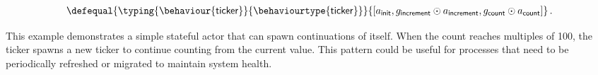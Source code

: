 \begin{example}
    \begin{equation}\label{eq:ticker-behaviour}
    \begin{aligned}
    \defequal{
      \typing{\behaviour{\mathsf{ticker}}}{\behaviourtype{\mathsf{ticker}}}
    }{
      [ a_{\mathsf{init}}
      , g_{\mathsf{increment}} \odot a_{\mathsf{increment}}
      , g_{\mathsf{count}} \odot a_{\mathsf{count}}
      ]
    }\,.
    \end{aligned}
    \end{equation}
    
    This example demonstrates a simple stateful actor that can spawn
    continuations of itself. When the count reaches multiples of 100, the ticker
    spawns a new ticker to continue counting from the current value. This
    pattern could be useful for processes that need to be periodically refreshed
    or migrated to maintain system health.
\end{example} 